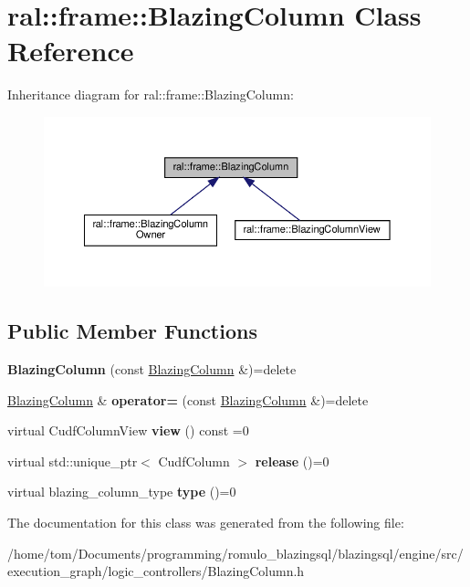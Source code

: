 \hypertarget{classral_1_1frame_1_1BlazingColumn}{}\section{ral\+:\+:frame\+:\+:Blazing\+Column Class Reference}
\label{classral_1_1frame_1_1BlazingColumn}


Inheritance diagram for ral\+:\+:frame\+:\+:Blazing\+Column\+:\nopagebreak
\begin{figure}[H]
\begin{center}
\leavevmode
\includegraphics[width=350pt]{classral_1_1frame_1_1BlazingColumn__inherit__graph}
\end{center}
\end{figure}
\subsection*{Public Member Functions}
\begin{DoxyCompactItemize}
\item 
\mbox{\label{classral_1_1frame_1_1BlazingColumn_aa925ea5a4e2c3577b938cfbe840abd62}} 
{\bfseries Blazing\+Column} (const \hyperlink{classral_1_1frame_1_1BlazingColumn}{Blazing\+Column} \&)=delete
\item 
\mbox{\label{classral_1_1frame_1_1BlazingColumn_aec09cbf7352b0a51ef81bdcd34fd409a}} 
\hyperlink{classral_1_1frame_1_1BlazingColumn}{Blazing\+Column} \& {\bfseries operator=} (const \hyperlink{classral_1_1frame_1_1BlazingColumn}{Blazing\+Column} \&)=delete
\item 
\mbox{\label{classral_1_1frame_1_1BlazingColumn_ad2552e447b9761a982a6bd11a3882243}} 
virtual Cudf\+Column\+View {\bfseries view} () const =0
\item 
\mbox{\label{classral_1_1frame_1_1BlazingColumn_a479d643c8e684bcb5583d289b38f8e8c}} 
virtual std\+::unique\+\_\+ptr$<$ Cudf\+Column $>$ {\bfseries release} ()=0
\item 
\mbox{\label{classral_1_1frame_1_1BlazingColumn_ad75eccd073f4af1bf312b9f667b252d8}} 
virtual blazing\+\_\+column\+\_\+type {\bfseries type} ()=0
\end{DoxyCompactItemize}


The documentation for this class was generated from the following file\+:\begin{DoxyCompactItemize}
\item 
/home/tom/\+Documents/programming/romulo\+\_\+blazingsql/blazingsql/engine/src/execution\+\_\+graph/logic\+\_\+controllers/Blazing\+Column.\+h\end{DoxyCompactItemize}
